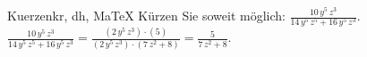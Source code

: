 \begin{MAufgabe}{Kuerzen}{kr, dh, MaTeX}
K\"urzen Sie soweit m\"oglich: $\frac{10\, y^5\, z^3}{14\, y^5\, z^5 + 16\, y^5\, z^3}$.\\ 
\ifLsg\MLoesung
\quad $\frac{10\, y^5\, z^3}{14\, y^5\, z^5 + 16\, y^5\, z^3}=\frac{(2\, y^5\, z^3)\cdot(5)}{(2\, y^5\, z^3)\cdot(7\, z^2 + 8)}=\frac{5}{7\, z^2 + 8}$.\else\relax\fi
 \end{MAufgabe}